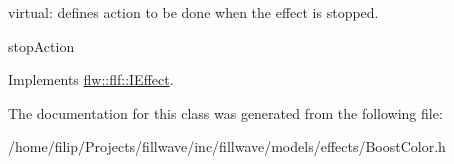 virtual\+: defines action to be done when the effect is stopped. 

stop\+Action 

Implements \hyperlink{classflw_1_1flf_1_1IEffect_a1a03eaf63a9d4edbd8764540d2d4133c}{flw\+::flf\+::\+I\+Effect}.



The documentation for this class was generated from the following file\+:\begin{DoxyCompactItemize}
\item 
/home/filip/\+Projects/fillwave/inc/fillwave/models/effects/Boost\+Color.\+h\end{DoxyCompactItemize}

